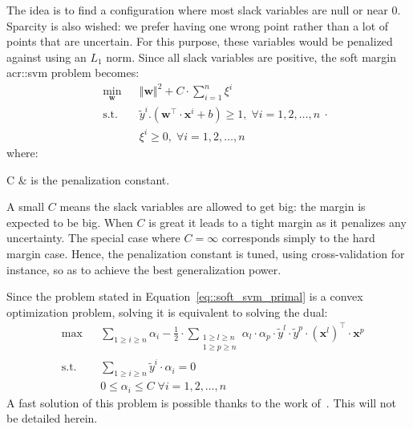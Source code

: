                The idea is to find a configuration where most slack variables are null or near $0$.
                Sparcity is also wished: we prefer having one wrong point rather than a lot of points that are uncertain.
                For this purpose, these variables would be penalized against using an $L_1$ norm.
                Since all slack variables are positive, the soft margin \gls{acr::svm} problem becomes:
                \begin{equation}
                    \label{eq::soft_svm_primal}
                    \begin{aligned}
                        & \min_{\bm{w}}
                        & & {\Vert \bm{w} \Vert}^2 + C \cdot \sum_{i=1}^n \xi^i \\
                        & \text{s.t.} & & \tilde{y}^i.(\bm{w}^\intercal\cdot\bm{x}^i + b) \geq 1, \; \forall i = 1, 2, \dots, n\\
                        & & & \xi^i \geq 0, \; \forall i = 1, 2, \dots, n
                    \end{aligned}.
                \end{equation}
                where:
                \begin{conditions}
                    C & is the penalization constant.\\
                \end{conditions}

                A small $C$ means the slack variables are allowed to get big: the margin is expected to be big.
                When $C$ is great it leads to a tight margin as it penalizes any uncertainty.
                The special case where $C=\infty$ corresponds simply to the hard margin case.
                Hence, the penalization constant is tuned, using cross-validation for instance, so as to achieve the best generalization power.

                Since the problem stated in Equation~\ref{eq::soft_svm_primal} is a convex optimization problem, solving it is equivalent to solving the dual:
                \begin{equation}
                    \label{eq::soft_svm_dual}
                    \begin{aligned}
                        & \max
                        & & \sum_{1\geq i \geq n} \alpha_i - \frac{1}{2}\cdot\sum_{\substack{1\geq l \geq n\\1\geq p \geq n}}\alpha_l\cdot\alpha_p\cdot\tilde{y}^l\cdot\tilde{y}^p\cdot(\bm{x}^l)^\intercal\cdot\bm{x}^p\\
                        &\text{s.t.} & & \sum_{1\geq i \geq n}\tilde{y}^i\cdot\alpha_i=0 \\
                        & & & 0 \leq \alpha_i \leq C \;\forall i=1,2,\dots,n
                        \end{aligned}
                \end{equation}
                A fast solution of this problem is possible thanks to the work of~\textcite{platt1998sequential}.
                This will not be detailed herein. 

